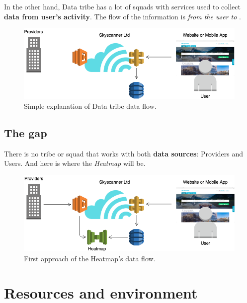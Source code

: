 In the other hand, Data tribe has a lot of squads with services used to collect \textbf{data from user's activity}. The flow of the information is \textit{from the user to \company}.

\begin{figure}[H]
\centering
\includegraphics[scale=0.45]{diagrams/state-of-the-art-tribes-data.png}
\caption{Simple explanation of Data tribe data flow.}
\end{figure}

\subsection{The gap}

There is no tribe or squad that works with both \textbf{data sources}: Providers and Users. And here is where the \textit{Heatmap} will be.

\begin{figure}[H]
\centering
\includegraphics[scale=0.45]{diagrams/state-of-the-art-tribes-hm.png}
\caption{First approach of the Heatmap's data flow.}
\end{figure}


\section{Resources and environment} \label{res_and_env}

